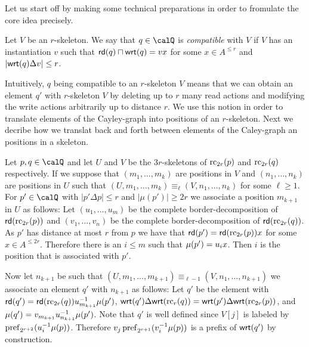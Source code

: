 Let us start off by making some technical preparations in order to fromulate the core idea precisely.
\begin{definition}
	Let $V$ be an $r$-skeleton. We say that $q\in\Qx$ is \emph{compatible} with $V$ 
	if $V$ has an instantiation $v$ such that $\mathsf{rd}(q) \sqcap \mathsf{wrt}(q)= vx$ for some $x\in A^{\leq r}$ and 
	$|\mathsf{wrt}(q) \Delta v| \leq r$.
\end{definition}
Intuitively, $q$ being compatible to an $r$-skeleton $V$ means that we can obtain an element
$q'$ with $r$-skeleton $V$ by deleting up to $r$ many read actions and modifying the write
actions arbitrarily up to distance $r$. We use this notion in order to translate elements of the Cayley-graph
into positions of an $r$-skeleton. Next we decribe how we translat back and forth between elements of the Caley-graph an positions in a skeleton.
\begin{definition}
	Let $p,q\in \Qx$ and let $U$ and $V$ be the $3r$-skeletons of $\operatorname{rc}_{2r}(p)$ and $\operatorname{rc}_{2r}(q)$ respectively. If we suppose that $(m_1,\ldots,m_k)$ are positions in $V$ and $(n_1,\ldots,n_k)$ are positions in $U$ such that $(U,m_1,\ldots,m_k) \equiv_{\ell} (V,n_1,\ldots,n_k)$ for some $\ell \geq 1$. For $p'\in \Qx$ with $|p'\Delta p| \leq r$ and $|\mu(p')| \geq 2r$ we associate a position $m_{k+1}$ in $U$ as follows:
	Let $(u_1,\ldots, u_m)$ be the complete border-decomposition of $\mathsf{rd}(\operatorname{rc}_{2r}(p))$ and $(v_1,\ldots,v_n)$ be the complete border-decomposition of $\mathsf{rd}(\operatorname{rc}_{2r}(q))$. As $p'$ has distance at most $r$ from $p$ we have that $\mathsf{rd}(p') = \mathsf{rd}(\operatorname{rc}_{2r}(p))x$
	for some $x\in A^{\leq 2r}$. Therefore there is an $i\leq m$ such that $\mu(p') = u_ix$. Then $i$ is the position that is associated with $p'$.
	
	Now let $n_{k+1}$ be such that $(U,m_1,\ldots,m_{k+1}) \equiv_{\ell-1} (V,n_1,\ldots,n_{k+1})$ we associate an element $q'$ with $n_{k+1}$ as follows:
	Let $q'$ be the element with $\mathsf{rd}(q') = \mathsf{rd}(\operatorname{rc}_{2r}(q))u_{m_{k+1}}^{-1}\mu(p')$, $\mathsf{wrt}(q')\Delta\mathsf{wrt}(\operatorname{rc}_r({q})) = \mathsf{wrt}(p')\Delta\mathsf{wrt}(\operatorname{rc}_{2r}({p}))$, and 
	$\mu(q') = v_{m_{k+1}}u_{n_{k+1}}^{-1}\mu(p')$. Note that $q'$ is well defined since $V[j]$ is labeled by $\operatorname{pref}_{2^{r+2}}(u_i^{-1}\mu(p))$. Therefore $v_j\operatorname{pref}_{2^{r+1}}(v_i^{-1}\mu(p))$ is a prefix of $\mathsf{wrt}(q')$ by construction.
\end{definition}


